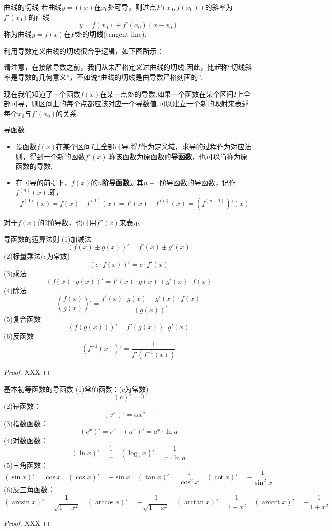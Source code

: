 \documentclass[lang=cn, zihao=5]{elegantbook}
\newcommand{\ssb}[1]{\left( #1 \right)}
\DeclareMathOperator{\arccot}{arccot}
\begin{document}
\begin{definition}{曲线的切线}
	若曲线$y=f(x)$在$x_0$处可导，则过点$P(x_0,f(x_0))$的斜率为$f'(x_0)$的直线$$y=f(x_0)+f'(x_0)(x-x_0)$$
	称为曲线$y=f(x)$在$P$处的\textbf{切线}(tangent line).
\end{definition}

利用导数定义曲线的切线很合乎逻辑，如下图所示：


请注意，在接触导数之前，我们从未严格定义过曲线的切线.因此，比起称“切线斜率是导数的几何意义”，不如说“曲线的切线是由导数严格刻画的”.

现在我们知道了一个函数$f(x)$在某一点处的导数.如果一个函数在某个区间$I$上全部可导，则区间上的每个点都应该对应一个导数值.可以建立一个新的映射来表述每个$x_0$与$f'(x_0)$的关系.

\begin{definition}{导函数}
	\begin{itemize}
		\item 设函数$f(x)$在某个区间$I$上全部可导.将$I$作为定义域，求导的过程作为对应法则，得到一个新的函数$f'(x)$.称该函数为原函数的\textbf{导函数}，也可以简称为原函数的导数.
		\item 在可导的前提下，$f(x)$的\textbf{$n$阶导函数}是其$n-1$阶导函数的导函数，记作$f^{(n)}(x)$.即，$$f^{(0)}(x)=f(x) \quad f^{(1)}(x)=f'(x) \quad f^{(n)}(x)=(f^{(n-1)})'(x)$$
	\end{itemize}
\end{definition}
\begin{remark}
	对于$f(x)$的$2$阶导数，也可用$f''(x)$来表示.
\end{remark}

\begin{theorem}{导函数的运算法则}
	(1)加减法$$(f(x) \pm g(x))'=f'(x) \pm g'(x)$$
	(2)标量乘法($c$为常数)$$(c \cdot f(x))'=c \cdot f'(x)$$
	(3)乘法$$(f(x) \cdot g(x))'=f'(x) \cdot g(x) + g'(x) \cdot f(x)$$
	(4)除法$$\ssb{ \frac{f(x)}{g(x)} }'=\frac{f'(x) \cdot g(x) - g'(x) \cdot f(x)}{(g(x))^2}$$
	(5)复合函数$$(f(g(x)))'=f'(g(x)) \cdot g'(x)$$
	(6)反函数$$(f^{-1}(x))'=\frac{1}{f'(f^{-1}(x))}$$
\end{theorem}
\begin{proof}
	XXX
\end{proof}

\begin{proposition}{基本初等函数的导函数}
	(1)常值函数：($c$为常数)$$(c)'=0$$
	(2)幂函数：$$(x^{\alpha})'=\alpha x^{\alpha -1}$$
	(3)指数函数：$$(e^x)'=e^x \quad (a^x)'=a^x \cdot \ln a$$
	(4)对数函数：$$(\ln x)'=\frac{1}{x} \quad (\log_{a}{x})'=\frac{1}{x\cdot \ln a}$$
	(5)三角函数：$$(\sin x)'=\cos x \quad (\cos x)'=-\sin x \quad (\tan x)'=\frac{1}{\cos ^2 x} \quad (\cot x)'=-\frac{1}{\sin ^2 x}$$
	(6)反三角函数：$$(\arcsin x)'=\frac{1}{\sqrt{1-x^2}} \quad (\arccos x)'=-\frac{1}{\sqrt{1-x^2}} \quad (\arctan x)'=\frac{1}{1+x^2} \quad (\arccot x)'=-\frac{1}{1+x^2}$$
\end{proposition}
\begin{proof}
	XXX
\end{proof}
\end{document}
